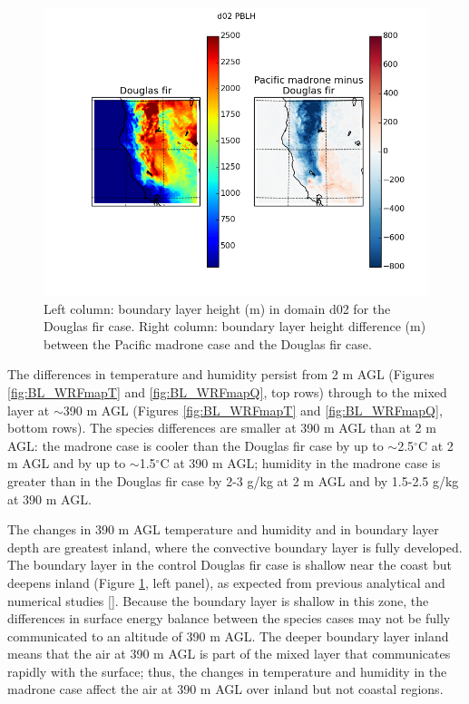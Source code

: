 \begin{figure}[here]
\includegraphics[width=1\textwidth]{ch2-BL/figures/PBLH_d02_s0pt08.png}
\caption{Left column: boundary layer height (m) in domain d02 for the Douglas fir case.  Right column: boundary layer height difference (m) between the Pacific madrone case and the Douglas fir case.}
\label{fig:BL_WRFmapPBLH}
\end{figure}

The differences in temperature and humidity persist from 2 m AGL (Figures \ref{fig:BL_WRFmapT} and \ref{fig:BL_WRFmapQ}, top rows) through to the mixed layer at $\sim$390 m AGL (Figures \ref{fig:BL_WRFmapT} and \ref{fig:BL_WRFmapQ}, bottom rows). The species differences are smaller at 390 m AGL than at 2 m AGL: the madrone case is cooler than the Douglas fir case by up to $\sim$2.5$^\circ$C at 2 m AGL and by up to $\sim$1.5$^\circ$C at 390 m AGL; humidity in the madrone case is greater than in the Douglas fir case by 2-3 g/kg at 2 m AGL and by 1.5-2.5 g/kg at 390 m AGL.

The changes in 390 m AGL temperature and humidity and in boundary layer depth are greatest inland, where the convective boundary layer is fully developed.  The boundary layer in the control Douglas fir case is shallow near the coast but deepens inland (Figure \ref{fig:BL_WRFmapPBLH}, left panel), as expected from previous analytical and numerical studies [\cite{garratt1990internal}].  Because the boundary layer is shallow in this zone, the differences in surface energy balance between the species cases may not be fully communicated to an altitude of 390 m AGL.  The deeper boundary layer inland means that the air at 390 m AGL is part of the mixed layer that communicates rapidly with the surface; thus, the changes in temperature and humidity in the madrone case affect the air at 390 m AGL over inland but not coastal regions.


